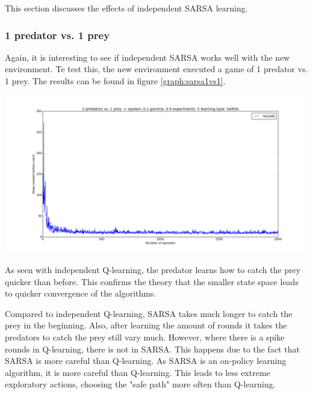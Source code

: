This section discusses the effects of independent SARSA learning.
\subsubsection{1 predator vs. 1 prey}
Again, it is interesting to see if independent SARSA works well with the new environment. Te test this, the new environment executed a game of 1 predator vs. 1 prey. The results can be found in figure \ref{graph:sarsa1vs1}.

\begin{center}
	\includegraphics[scale=0.3]{1_predator_1_prey_SARSA}
	\label{graph:sarsa1vs1}
\end{center}

As seen with independent Q-learning, the predator learns how to catch the prey quicker than before. This confirms the theory that the smaller state space leads to quicker convergence of the algorithms. 

Compared to independent Q-learning, SARSA takes much longer to catch the prey in the beginning. Also, after learning the amount of rounds it takes the predators to catch the prey still vary much. However, where there is a spike rounds in Q-learning, there is not in SARSA.  This happens due to the fact that SARSA is more careful than Q-learning. As SARSA is an on-policy learning algorithm, it is more careful than Q-learning. This leads to less extreme exploratory actions, choosing the "safe path" more often than Q-learning.

